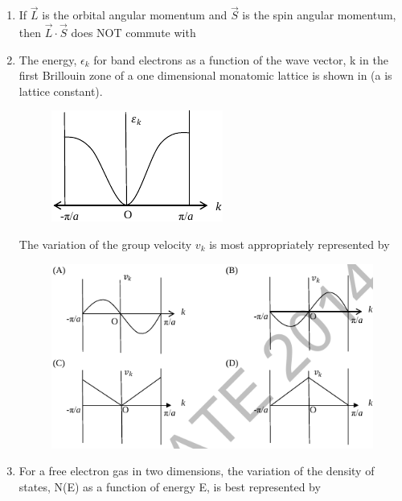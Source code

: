\documentclass[journal,12pt,onecolumn]{IEEEtran}
\theoremstyle{remark}
\begin{document}
\begin{enumerate}
\item If $\vec{L}$ is the orbital angular momentum and $\vec{S}$ is the spin angular momentum, then $\vec{L} \cdot \vec{S}$ does NOT commute with
\hfill{} \begin{enumerate}  \end{enumerate}

\item The energy, $\epsilon_k$ for band electrons as a function of the wave vector, k in the first Brillouin zone  of a one dimensional monatomic lattice is shown in  (a is lattice constant).
\begin{figure}[H]
\centering
 \caption{} \label{fig:32} \includegraphics[width=0.3\columnwidth]{figs/q32.png}
\end{figure}
The variation of the group velocity $v_k$ is most appropriately represented by
\hfill{}
\begin{figure}[H]
\centering
 \caption*{} \label{fig:32o} \includegraphics[width=0.8\columnwidth]{figs/q32o.png}
\end{figure}
\item For a free electron gas in two dimensions, the variation of the density of states, N(E) as a function of energy E, is best represented by

\end{enumerate}
\end{document}
